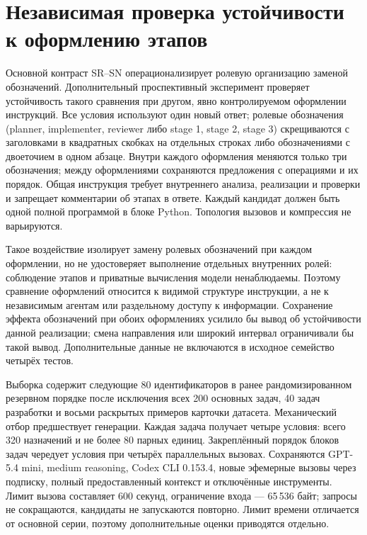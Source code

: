\section{Независимая проверка устойчивости к оформлению этапов}
\label{sec:segregation80}

Основной контраст SR--SN операционализирует ролевую организацию заменой обозначений. Дополнительный проспективный эксперимент проверяет устойчивость такого сравнения при другом, явно контролируемом оформлении инструкций. Все условия используют один новый ответ; ролевые обозначения (planner, implementer, reviewer либо stage 1, stage 2, stage 3) скрещиваются с заголовками в квадратных скобках на отдельных строках либо обозначениями с двоеточием в одном абзаце. Внутри каждого оформления меняются только три обозначения; между оформлениями сохраняются предложения с операциями и их порядок. Общая инструкция требует внутреннего анализа, реализации и проверки и запрещает комментарии об этапах в ответе. Каждый кандидат должен быть одной полной программой в блоке Python. Топология вызовов и компрессия не варьируются.

Такое воздействие изолирует замену ролевых обозначений при каждом оформлении, но не удостоверяет выполнение отдельных внутренних ролей: соблюдение этапов и приватные вычисления модели ненаблюдаемы. Поэтому сравнение оформлений относится к видимой структуре инструкции, а не к независимым агентам или раздельному доступу к информации. Сохранение эффекта обозначений при обоих оформлениях усилило бы вывод об устойчивости данной реализации; смена направления или широкий интервал ограничивали бы такой вывод. Дополнительные данные не включаются в исходное семейство четырёх тестов.

Выборка содержит следующие 80 идентификаторов в ранее рандомизированном резервном порядке после исключения всех 200 основных задач, 40 задач разработки и восьми раскрытых примеров карточки датасета. Механический отбор предшествует генерации. Каждая задача получает четыре условия: всего 320 назначений и не более 80 парных единиц. Закреплённый порядок блоков задач чередует условия при четырёх параллельных вызовах. Сохраняются GPT-5.4 mini, medium reasoning, Codex CLI 0.153.4, новые эфемерные вызовы через подписку, полный предоставленный контекст и отключённые инструменты. Лимит вызова составляет 600 секунд, ограничение входа --- 65\,536 байт; запросы не сокращаются, кандидаты не запускаются повторно. Лимит времени отличается от основной серии, поэтому дополнительные оценки приводятся отдельно.

